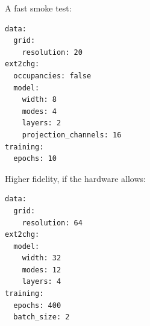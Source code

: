 A fast smoke test:

\begin{lstlisting}
data:
  grid:
    resolution: 20
ext2chg:
  occupancies: false
  model:
    width: 8
    modes: 4
    layers: 2
    projection_channels: 16
training:
  epochs: 10
\end{lstlisting}

Higher fidelity, if the hardware allows:

\begin{lstlisting}
data:
  grid:
    resolution: 64
ext2chg:
  model:
    width: 32
    modes: 12
    layers: 4
training:
  epochs: 400
  batch_size: 2
\end{lstlisting}
